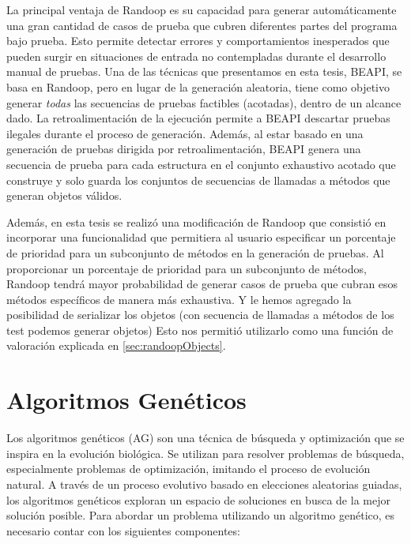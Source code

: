 La principal ventaja de \textsf{Randoop} es su capacidad para generar automáticamente una gran cantidad de casos de prueba que cubren diferentes partes del programa bajo prueba. Esto permite detectar errores y comportamientos inesperados que pueden surgir en situaciones de entrada no contempladas durante el desarrollo manual de pruebas.
Una de las técnicas que presentamos en esta tesis, \textsf{BEAPI}, se basa en \textsf{Randoop}, pero en lugar de la generación aleatoria, tiene como objetivo generar \emph{todas} las secuencias de pruebas factibles (acotadas), dentro de un alcance dado. La retroalimentación de la ejecución permite a \textsf{BEAPI} descartar pruebas ilegales durante el proceso de generación. Además, al estar basado en una generación de pruebas dirigida por retroalimentación, \textsf{BEAPI} genera una secuencia de prueba para cada estructura en el conjunto exhaustivo acotado que construye y solo guarda los conjuntos de secuencias de llamadas a métodos que generan objetos válidos.


Además, en esta tesis se realizó una modificación de Randoop que consistió en incorporar una funcionalidad que permitiera al usuario especificar un porcentaje de prioridad para un subconjunto de métodos en la generación de pruebas. Al proporcionar un porcentaje de prioridad para un subconjunto de métodos, Randoop tendrá mayor probabilidad de generar casos de prueba que cubran esos métodos específicos de manera más exhaustiva. Y le hemos agregado la posibilidad de serializar los objetos (con secuencia de llamadas a métodos de los test podemos generar objetos) Esto nos permitió utilizarlo como una función de valoración explicada en \ref{sec:randoopObjects}.


\section{Algoritmos Genéticos}
\label{sec:geneticoPrev}
Los algoritmos genéticos (AG) \cite{goldberg1989genetic} son una técnica de búsqueda y optimización que se inspira en la evolución biológica. Se utilizan para resolver problemas de búsqueda, especialmente problemas de optimización, imitando el proceso de evolución natural. A través de un proceso evolutivo basado en elecciones aleatorias guiadas, los algoritmos genéticos exploran un espacio de soluciones en busca de la mejor solución posible.
Para abordar un problema utilizando un algoritmo genético, es necesario contar con los siguientes componentes:

